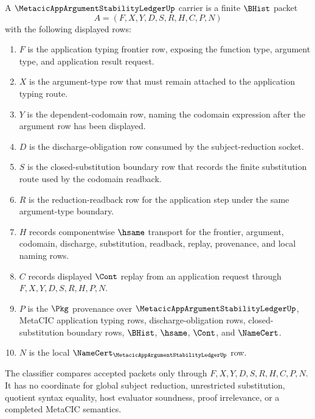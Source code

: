 \begin{definition}
\label{def:metacic-app-argument-stability-ledger-carrier}
A $\MetacicAppArgumentStabilityLedgerUp$ carrier is a finite $\BHist$ packet
$$
A=(F,X,Y,D,S,R,H,C,P,N)
$$
with the following displayed rows:
\begin{enumerate}
\item $F$ is the application typing frontier row, exposing the function type, argument type, and application result request.
\item $X$ is the argument-type row that must remain attached to the application typing route.
\item $Y$ is the dependent-codomain row, naming the codomain expression after the argument row has been displayed.
\item $D$ is the discharge-obligation row consumed by the subject-reduction socket.
\item $S$ is the closed-substitution boundary row that records the finite substitution route used by the codomain readback.
\item $R$ is the reduction-readback row for the application step under the same argument-type boundary.
\item $H$ records componentwise $\hsame$ transport for the frontier, argument, codomain, discharge, substitution, readback, replay, provenance, and local naming rows.
\item $C$ records displayed $\Cont$ replay from an application request through $F,X,Y,D,S,R,H,P,N$.
\item $P$ is the $\Pkg$ provenance over $\MetacicAppArgumentStabilityLedgerUp$, MetaCIC application typing rows, discharge-obligation rows, closed-substitution boundary rows, $\BHist$, $\hsame$, $\Cont$, and $\NameCert$.
\item $N$ is the local $\NameCert_{\MetacicAppArgumentStabilityLedgerUp}$ row.
\end{enumerate}
The classifier compares accepted packets only through $F,X,Y,D,S,R,H,C,P,N$. It has no coordinate for global subject reduction, unrestricted substitution, quotient syntax equality, host evaluator soundness, proof irrelevance, or a completed MetaCIC semantics.
\end{definition}

